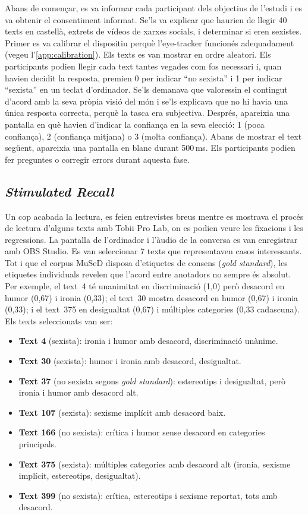 Abans de començar, es va informar cada participant dels objectius de l'estudi i es va obtenir el consentiment informat.
Se'ls va explicar que haurien de llegir 40 texts en castellà, extrets de vídeos de xarxes socials, i determinar si eren sexistes.
Primer es va calibrar el dispositiu perquè l'eye-tracker funcionés adequadament (vegeu l'\autoref{app:calibration}).
Els texts es van mostrar en ordre aleatori.
Els participants podien llegir cada text tantes vegades com fos necessari i, quan havien decidit la resposta, premien 0 per indicar ``no sexista'' i 1 per indicar ``sexista'' en un teclat d'ordinador.
Se'ls demanava que valoressin el contingut d'acord amb la seva pròpia visió del món i se'ls explicava que no hi havia una única resposta correcta, perquè la tasca era subjectiva.
Després, apareixia una pantalla en què havien d'indicar la confiança en la seva elecció: 1 (poca confiança), 2 (confiança mitjana) o 3 (molta confiança).
Abans de mostrar el text següent, apareixia una pantalla en blanc durant 500\,ms.
Els participants podien fer preguntes o corregir errors durant aquesta fase.

\subsection{\textit{Stimulated Recall}}

Un cop acabada la lectura, es feien entrevistes breus mentre es mostrava el procés de lectura d'alguns texts amb Tobii Pro Lab, on es podien veure les fixacions i les regressions.
La pantalla de l'ordinador i l'àudio de la conversa es van enregistrar amb OBS Studio.
Es van seleccionar 7 texts que representaven casos interessants.
Tot i que el corpus MuSeD disposa d'etiquetes de consens (\textit{gold standard}), les etiquetes individuals revelen que l'acord entre anotadors no sempre és absolut.
Per exemple, el text~4 té unanimitat en discriminació (1,0) però desacord en humor (0,67) i ironia (0,33); el text~30 mostra desacord en humor (0,67) i ironia (0,33); i el text~375 en desigualtat (0,67) i múltiples categories (0,33 cadascuna).
Els texts seleccionats van ser:
\begin{itemize}
    \item \textbf{Text 4} (sexista): ironia i humor amb desacord, discriminació unànime.
    \item \textbf{Text 30} (sexista): humor i ironia amb desacord, desigualtat.
    \item \textbf{Text 37} (no sexista segons \textit{gold standard}): estereotips i desigualtat, però ironia i humor amb desacord alt.
    \item \textbf{Text 107} (sexista): sexisme implícit amb desacord baix.
    \item \textbf{Text 166} (no sexista): crítica i humor sense desacord en categories principals.
    \item \textbf{Text 375} (sexista): múltiples categories amb desacord alt (ironia, sexisme implícit, estereotips, desigualtat).
    \item \textbf{Text 399} (no sexista): crítica, estereotips i sexisme reportat, tots amb desacord.
\end{itemize}

